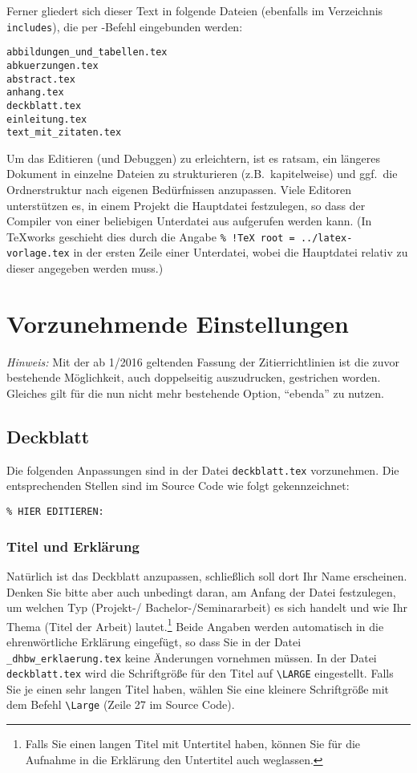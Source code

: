 Ferner gliedert sich dieser Text in folgende Dateien (ebenfalls im Verzeichnis \verb|includes|), die per \verb||-Befehl eingebunden werden:
\begin{verbatim}
abbildungen_und_tabellen.tex
abkuerzungen.tex
abstract.tex
anhang.tex
deckblatt.tex
einleitung.tex
text_mit_zitaten.tex
\end{verbatim}

Um das Editieren (und Debuggen) zu erleichtern, ist es ratsam, ein längeres Dokument in einzelne Dateien zu strukturieren (z.B.\ kapitelweise) und ggf.\ die Ordnerstruktur nach eigenen Bedürfnissen anzupassen. Viele Editoren unterstützen es, in einem Projekt die Hauptdatei festzulegen, so dass der Compiler von einer beliebigen Unterdatei aus aufgerufen werden kann. (In TeXworks geschieht dies durch die Angabe \verb|% !TeX root = ../latex-vorlage.tex| in der ersten Zeile einer Unterdatei, wobei die Hauptdatei relativ zu dieser angegeben werden muss.)

\section{Vorzunehmende Einstellungen}

\emph{Hinweis:} Mit der ab 1/2016 geltenden Fassung der Zitierrichtlinien ist die zuvor bestehende Möglichkeit, auch doppelseitig auszudrucken, gestrichen worden. Gleiches gilt für die nun nicht mehr bestehende Option, \enquote{ebenda} zu nutzen.

\subsection{Deckblatt}

Die folgenden Anpassungen sind in der Datei \verb|deckblatt.tex| vorzunehmen. Die entsprechenden Stellen sind im Source Code wie folgt gekennzeichnet:
\lstset{language=TeX} 
\begin{lstlisting}
% HIER EDITIEREN: 
\end{lstlisting}

\subsubsection{Titel und Erklärung}
Natürlich ist das Deckblatt anzupassen, schließlich soll dort Ihr Name erscheinen. Denken Sie bitte aber auch unbedingt daran, am Anfang der Datei festzulegen, um welchen Typ (Projekt-/ Bachelor-/Seminararbeit) es sich handelt und wie Ihr Thema (Titel der Arbeit) lautet.\footnote{%
Falls Sie einen langen Titel mit Untertitel haben, können Sie für die Aufnahme in die Erklärung den Untertitel auch weglassen.} Beide Angaben werden automatisch in die ehrenwörtliche Erklärung eingefügt, so dass Sie in der Datei \verb|_dhbw_erklaerung.tex| keine Änderungen vornehmen müssen.
In der Datei \verb|deckblatt.tex| wird die Schriftgröße für den Titel auf \verb|\LARGE| eingestellt. Falls Sie je einen sehr langen Titel haben, wählen Sie eine kleinere Schriftgröße mit dem Befehl \verb|\Large| (Zeile 27 im Source Code).

